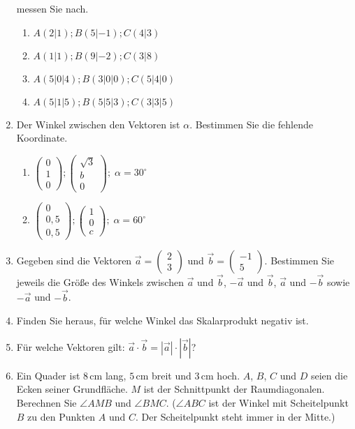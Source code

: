 \documentclass[12pt,a4paper,twoside,fleqn]{article}
\begin{document}
\begin{enumerate}
  messen Sie nach.
  \begin{multicols}{2}
    \begin{enumerate}
    \item $A(2|1); B(5|-1); C(4|3)$
    \item $A(1|1); B(9|-2); C(3|8)$
    \item $A(5|0|4); B(3|0|0); C(5|4|0)$
    \item $A(5|1|5); B(5|5|3); C(3|3|5)$
    \end{enumerate}
  \end{multicols}
\item Der Winkel zwischen den Vektoren ist $\alpha$. Bestimmen Sie die
  fehlende Koordinate.
  \begin{multicols}{2}
    \begin{enumerate}
     \item  $\begin{pmatrix}
      0\\1\\0
    \end{pmatrix};
   \begin{pmatrix}
      \sqrt{3}\\b\\0
    \end{pmatrix}; \;
    \alpha = 30^\circ$ 
  \item  $\begin{pmatrix}
      0\\0,5\\0,5
    \end{pmatrix};
   \begin{pmatrix}
      1\\0\\c
    \end{pmatrix};\;
    \alpha = 60^\circ$
    \end{enumerate}
  \end{multicols}
\item Gegeben sind die Vektoren
  $\vec{a}=\begin{pmatrix} 2\\3 \end{pmatrix}$ und 
  $\vec{b}=\begin{pmatrix} -1\\5 \end{pmatrix}$. Bestimmen Sie jeweils
  die Größe des Winkels zwischen $\vec{a}$ und $\vec{b}$, $-\vec{a}$
  und $\vec{b}$, $\vec{a}$ und $-\vec{b}$ sowie $-\vec{a}$ und $-\vec{b}$.
\item Finden Sie heraus, für welche Winkel das Skalarprodukt negativ ist.
\item Für welche Vektoren gilt: $ \vec{a}\cdot\vec{b}=  |\vec{a}|\cdot|\vec{b}|$?
\item Ein Quader ist $8\,$cm lang, $5\,$cm breit und $3\,$cm
  hoch. $A$, $B$, $C$ und $D$ seien die Ecken seiner Grundfläche. $M$
  ist der Schnittpunkt der Raumdiagonalen. Berechnen Sie $\angle AMB$
  und $\angle BMC$. ($\angle ABC$ ist der Winkel mit Scheitelpunkt $B$
  zu den Punkten $A$ und $C$. Der Scheitelpunkt steht immer in der Mitte.)
\end{enumerate}
\end{document}
